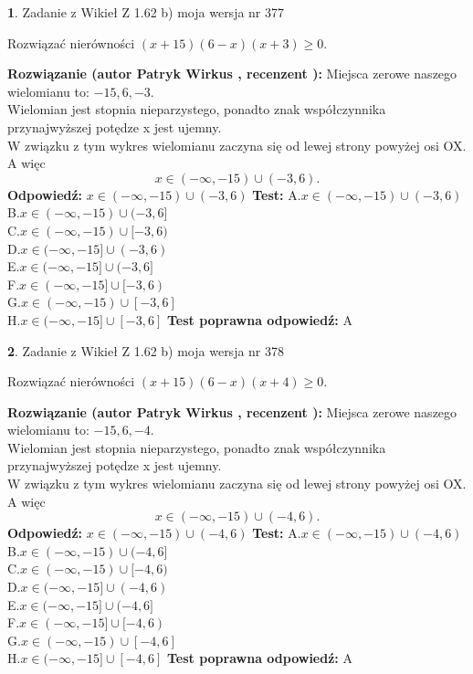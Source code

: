 \documentclass[12pt, a4paper]{article}
\theoremstyle{definition} %
\newtheorem{zad}{}
\newcommand{\zadStart}[1]{\begin{zad}#1\newline}
\newcommand{\zadStop}{\end{zad}}
\newcommand{\rozwStart}[2]{\noindent \textbf{Rozwiązanie (autor #1 , recenzent #2): }\newline}
\newcommand{\rozwStop}{\newline}
\newcommand{\odpStart}{\noindent \textbf{Odpowiedź:}\newline}
\newcommand{\odpStop}{\newline}
\newcommand{\testStart}{\noindent \textbf{Test:}\newline}
\newcommand{\testStop}{\newline}
\newcommand{\kluczStart}{\noindent \textbf{Test poprawna odpowiedź:}\newline}
\newcommand{\kluczStop}{\newline}
\begin{document}
\zadStart{Zadanie z Wikieł Z 1.62 b) moja wersja nr 377}

Rozwiązać nierówności $(x+15)(6-x)(x+3)\ge0$.
\zadStop
\rozwStart{Patryk Wirkus}{}
Miejsca zerowe naszego wielomianu to: $-15, 6, -3$.\\
Wielomian jest stopnia nieparzystego, ponadto znak współczynnika przy\linebreak najwyższej potędze x jest ujemny.\\ W związku z tym wykres wielomianu zaczyna się od lewej strony powyżej osi OX. A więc $$x \in (-\infty,-15) \cup (-3,6).$$
\rozwStop
\odpStart
$x \in (-\infty,-15) \cup (-3,6)$
\odpStop
\testStart
A.$x \in (-\infty,-15) \cup (-3,6)$\\
B.$x \in (-\infty,-15) \cup (-3,6]$\\
C.$x \in (-\infty,-15) \cup [-3,6)$\\
D.$x \in (-\infty,-15] \cup (-3,6)$\\
E.$x \in (-\infty,-15] \cup (-3,6]$\\
F.$x \in (-\infty,-15] \cup [-3,6)$\\
G.$x \in (-\infty,-15) \cup [-3,6]$\\
H.$x \in (-\infty,-15] \cup [-3,6]$
\testStop
\kluczStart
A
\kluczStop



\zadStart{Zadanie z Wikieł Z 1.62 b) moja wersja nr 378}

Rozwiązać nierówności $(x+15)(6-x)(x+4)\ge0$.
\zadStop
\rozwStart{Patryk Wirkus}{}
Miejsca zerowe naszego wielomianu to: $-15, 6, -4$.\\
Wielomian jest stopnia nieparzystego, ponadto znak współczynnika przy\linebreak najwyższej potędze x jest ujemny.\\ W związku z tym wykres wielomianu zaczyna się od lewej strony powyżej osi OX. A więc $$x \in (-\infty,-15) \cup (-4,6).$$
\rozwStop
\odpStart
$x \in (-\infty,-15) \cup (-4,6)$
\odpStop
\testStart
A.$x \in (-\infty,-15) \cup (-4,6)$\\
B.$x \in (-\infty,-15) \cup (-4,6]$\\
C.$x \in (-\infty,-15) \cup [-4,6)$\\
D.$x \in (-\infty,-15] \cup (-4,6)$\\
E.$x \in (-\infty,-15] \cup (-4,6]$\\
F.$x \in (-\infty,-15] \cup [-4,6)$\\
G.$x \in (-\infty,-15) \cup [-4,6]$\\
H.$x \in (-\infty,-15] \cup [-4,6]$
\testStop
\kluczStart
A
\kluczStop
\end{document}
